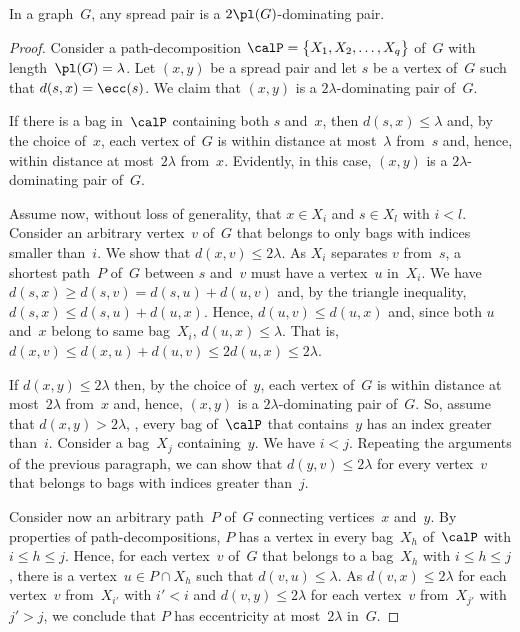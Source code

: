 \begin{theorem}
    \label{theo:domPairApprox}
In a graph~\( G \), any spread pair is a \( 2 \pl(G) \)-dominating pair.
\end{theorem}

\begin{proof}
Consider a path-decomposition $\calP = \big \{ X_1, X_2, \ldots, X_q \big \}$ of~$G$ with length~$\pl(G) = \lambda$.
Let $(x, y)$ be a spread pair and let $s$ be a vertex of~$G$ such that $d(s, x) = \ecc(s)$.
We claim that $(x, y)$ is a $2 \lambda$-dominating pair of~$G$.

If there is a bag in~$\calP$ containing both $s$ and~$x$, then $d(s, x) \leq \lambda$ and, by the choice of~$x$, each vertex of~$G$ is within distance at most~$\lambda$ from~$s$ and, hence, within distance at most~$2 \lambda$ from~$x$.
Evidently, in this case, $(x, y)$ is a $2 \lambda$-dominating pair of~$G$.

Assume now, without loss of generality, that $x \in X_i$ and $s \in X_l$ with $i < l$.
Consider an arbitrary vertex~$v$ of~$G$ that belongs to only bags with indices smaller than~$i$.
We show that $d(x, v) \leq 2 \lambda$.
As $X_i$ separates $v$ from~$s$, a shortest path~$P$ of~$G$ between $s$ and~$v$ must have a vertex~$u$ in~$X_i$.
We have $d(s, x) \geq d(s, v) = d(s, u) + d(u,v)$ and, by the triangle inequality, $d(s, x) \leq d(s, u) + d(u, x)$.
Hence, $d(u, v) \leq d(u, x)$ and, since both $u$ and~$x$ belong to same bag~$X_i$, $d(u, x) \leq \lambda$.
That is, $d(x, v) \leq d(x, u) + d(u, v) \leq 2 d(u, x) \leq 2 \lambda$.

If $d(x, y) \leq 2 \lambda$ then, by the choice of~$y$, each vertex of~$G$ is within distance at most~$2 \lambda$ from~$x$ and, hence, $(x, y)$ is a $2 \lambda$-dominating pair of~$G$.
So, assume that $d(x, y)> 2 \lambda$, \ie, every bag of~$\calP$ that contains~$y$ has an index greater than~$i$.
Consider a bag~$X_j$ containing~$y$.
We have $i < j$.
Repeating the arguments of the previous paragraph, we can show that $d(y, v) \leq 2 \lambda$ for every vertex~$v$ that belongs to bags with indices greater than~$j$.

Consider now an arbitrary path~$P$ of~$G$ connecting vertices~$x$ and~$y$.
By properties of path-decompositions, $P$ has a vertex in every bag~$X_h$ of~$\calP$ with $i \leq h \leq j$.
Hence, for each vertex~$v$ of~$G$ that belongs to a bag~$X_h$ with $i \leq h \leq j$, there is a vertex~$u \in P \cap X_h$ such that $d(v, u) \leq \lambda$.
As $d(v, x) \leq 2 \lambda$ for each vertex~$v$ from~$X_{i'}$ with $i' < i$ and $d(v, y) \leq 2 \lambda$ for each vertex~$v$ from~$X_{j'}$ with $j' > j$, we conclude that $P$ has eccentricity at most~$2 \lambda$ in~$G$.
\end{proof}



